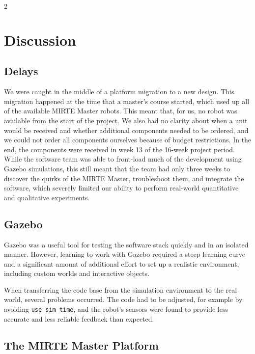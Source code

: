 \documentclass{article}
\begin{document}
\clearpage %
\begin{multicols}{2}

%



\section{Discussion}

\subsection{Delays}

We were caught in the middle of a platform migration to a new design. This migration happened at the time that a master's course started, which used up all of the available MIRTE Master robots. This meant that, for us, no robot was available from the start of the project. We also had no clarity about when a unit would be received and whether additional components needed to be ordered, and we could not order all components ourselves because of budget restrictions. In the end, the components were received in week 13 of the 16-week project period. While the software team was able to front-load much of the development using Gazebo simulations, this still meant that the team had only three weeks to discover the quirks of the MIRTE Master, troubleshoot them, and integrate the software, which severely limited our ability to perform real-world quantitative and qualitative experiments.

\subsection{Gazebo}

Gazebo was a useful tool for testing the software stack quickly and in an isolated manner. However, learning to work with Gazebo required a steep learning curve and a significant amount of additional effort to set up a realistic environment, including custom worlds and interactive objects.

When transferring the code base from the simulation environment to the real world, several problems occurred. The code had to be adjusted, for example by avoiding \texttt{use\_sim\_time}, and the robot's sensors were found to provide less accurate and less reliable feedback than expected.

\subsection{The MIRTE Master Platform}


\end{multicols}
\end{document}
